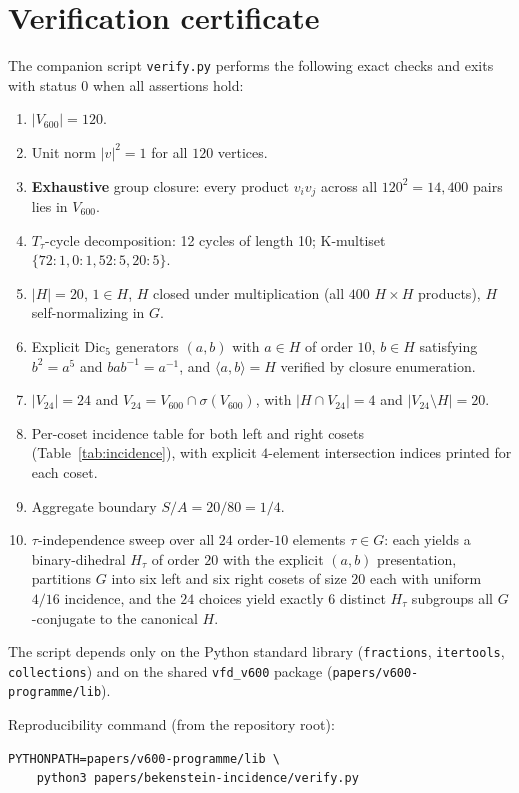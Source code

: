 \documentclass[11pt]{article}
\newcommand{\Vsixhundred}{V_{600}}
\newcommand{\Vtwentyfour}{V_{24}}
\begin{document}
\appendix

\section{Verification certificate}\label{app:verify}

The companion script \texttt{verify.py} performs the following exact
checks and exits with status $0$ when all assertions hold:
\begin{enumerate}
\item $|\Vsixhundred| = 120$.
\item Unit norm $|v|^2 = 1$ for all $120$ vertices.
\item \textbf{Exhaustive} group closure: every product $v_i v_j$ across
all $120^2 = 14{,}400$ pairs lies in $\Vsixhundred$.
\item $T_\tau$-cycle decomposition: 12 cycles of length 10; K-multiset
$\{72{:}1, 0{:}1, 52{:}5, 20{:}5\}$.
\item $|H| = 20$, $1 \in H$, $H$ closed under multiplication (all $400$
$H \times H$ products), $H$ self-normalizing in $G$.
\item Explicit Dic$_5$ generators $(a, b)$ with $a \in H$ of order
$10$, $b \in H$ satisfying $b^2 = a^5$ and $bab^{-1} = a^{-1}$, and
$\langle a, b \rangle = H$ verified by closure enumeration.
\item $|\Vtwentyfour| = 24$ and $\Vtwentyfour = \Vsixhundred \cap
\sigma(\Vsixhundred)$, with $|H \cap \Vtwentyfour| = 4$ and
$|\Vtwentyfour \setminus H| = 20$.
\item Per-coset incidence table for both left and right cosets
(Table~\ref{tab:incidence}), with explicit $4$-element intersection
indices printed for each coset.
\item Aggregate boundary $S/A = 20/80 = 1/4$.
\item $\tau$-independence sweep over all $24$ order-$10$ elements
$\tau \in G$: each yields a binary-dihedral $H_\tau$ of order $20$
with the explicit $(a, b)$ presentation, partitions $G$ into six
left and six right cosets of size $20$ each with uniform
$4 / 16$ incidence, and the $24$ choices yield exactly $6$ distinct
$H_\tau$ subgroups all $G$-conjugate to the canonical $H$.
\end{enumerate}

The script depends only on the Python standard library
(\texttt{fractions}, \texttt{itertools}, \texttt{collections}) and on
the shared \texttt{vfd\_v600} package
(\texttt{papers/v600-programme/lib}).

Reproducibility command (from the repository root):
\begin{verbatim}
PYTHONPATH=papers/v600-programme/lib \
    python3 papers/bekenstein-incidence/verify.py
\end{verbatim}



\end{document}

